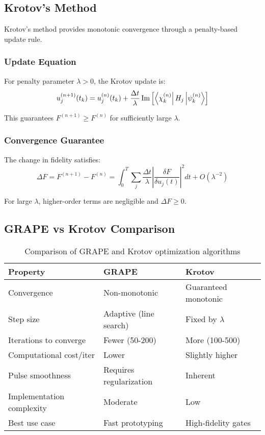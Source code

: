 \documentclass[11pt,a4paper]{article}
\theoremstyle{definition}
\theoremstyle{remark}
\begin{document}
\subsection{Krotov's Method}

Krotov's method provides monotonic convergence through a penalty-based update rule.

\subsubsection{Update Equation}

For penalty parameter $\lambda > 0$, the Krotov update is:
\begin{equation}
u_j^{(n+1)}(t_k) = u_j^{(n)}(t_k) + \frac{\Delta t}{\lambda}\Im\left[\bra{\chi^{(n)}_k} H_j \ket{\psi^{(n)}_k}\right]
\end{equation}

This guarantees $F^{(n+1)} \geq F^{(n)}$ for sufficiently large $\lambda$.

\subsubsection{Convergence Guarantee}

The change in fidelity satisfies:
\begin{equation}
\Delta F = F^{(n+1)} - F^{(n)} = \int_0^T \sum_j \frac{\Delta t}{\lambda}\left|\frac{\delta F}{\delta u_j(t)}\right|^2 dt + O(\lambda^{-2})
\end{equation}

For large $\lambda$, higher-order terms are negligible and $\Delta F \geq 0$.

\subsection{GRAPE vs Krotov Comparison}

\begin{table}[h]
\centering
\begin{tabular}{lll}
\toprule
\textbf{Property} & \textbf{GRAPE} & \textbf{Krotov} \\
\midrule
Convergence & Non-monotonic & Guaranteed monotonic \\
Step size & Adaptive (line search) & Fixed by $\lambda$ \\
Iterations to converge & Fewer (50-200) & More (100-500) \\
Computational cost/iter & Lower & Slightly higher \\
Pulse smoothness & Requires regularization & Inherent \\
Implementation complexity & Moderate & Low \\
Best use case & Fast prototyping & High-fidelity gates \\
\bottomrule
\end{tabular}
\caption{Comparison of GRAPE and Krotov optimization algorithms}
\end{table}
\end{document}

